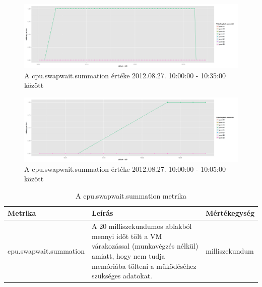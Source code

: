 \documentclass[a4paper,10pt,titlepage]{article}
\begin{document}
\begin{figure}[h!]
\centering
\includegraphics[width=1.00\textwidth]{figures/cpu_swapwait_summation-20120827100000-20120827103500.png}
\caption{A cpu.swapwait.summation értéke 2012.08.27. 10:00:00 - 10:35:00 között \label{fig:cpu_swapwait_summation_082701}}
\end{figure}

\begin{figure}[h!]
\centering
\includegraphics[width=1.00\textwidth]{figures/cpu_swapwait_summation-20120827100000-20120827100500.png}
\caption{A cpu.swapwait.summation értéke 2012.08.27. 10:00:00 - 10:05:00 között \label{fig:cpu_swapwait_summation_082702}}
\end{figure}

\begin{table}[h]
	\caption{A cpu.swapwait.summation metrika}
	\centering
	\small
	\begin{tabular}{| p{3.5cm} | p{7.5cm} | p{2cm} |}
		\hline
		\rowcolor{tc_bone} \textbf{Metrika} & \textbf{Leírás} & \textbf{Mértékegység} \\
		\hline
		cpu.swapwait.summation & A 20 milliszekundumos ablakból mennyi időt tölt a VM várakozással (munkavégzés nélkül) amiatt, hogy nem tudja memóriába tölteni a működéséhez szükséges adatokat. & milliszekundum \\ 
		\hline
	\end{tabular}
	\normalsize
	\label{tab:cpu.swapwait.summation}
\end{table}

\end{document}
